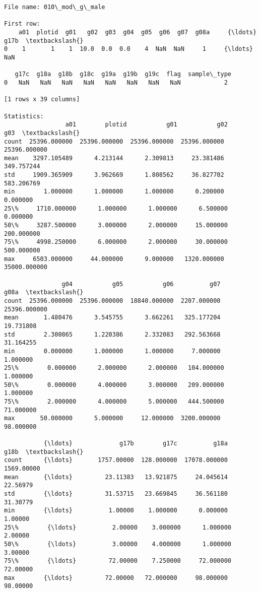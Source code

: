 \documentclass[11pt]{article}
\begin{document}
\begin{Verbatim}[commandchars=\\\{\}]
File name: 010\_mod\_g\_male

First row: 
    a01  plotid  g01   g02  g03  g04  g05  g06  g07  g08a     {\ldots}       g17b  \textbackslash{}
0    1       1    1  10.0  0.0  0.0    4  NaN  NaN     1     {\ldots}        NaN   

   g17c  g18a  g18b  g18c  g19a  g19b  g19c  flag  sample\_type  
0   NaN   NaN   NaN   NaN   NaN   NaN   NaN   NaN            2  

[1 rows x 39 columns]

Statistics: 
                 a01        plotid           g01           g02           g03  \textbackslash{}
count  25396.000000  25396.000000  25396.000000  25396.000000  25396.000000   
mean    3297.105489      4.213144      2.309813     23.381486    349.757244   
std     1909.365909      3.962669      1.808562     36.827702    583.206769   
min        1.000000      1.000000      1.000000      0.200000      0.000000   
25\%     1710.000000      1.000000      1.000000      6.500000      0.000000   
50\%     3287.500000      3.000000      2.000000     15.000000    200.000000   
75\%     4998.250000      6.000000      2.000000     30.000000    500.000000   
max     6503.000000     44.000000      9.000000   1320.000000  35000.000000   

                g04           g05           g06          g07          g08a  \textbackslash{}
count  25396.000000  25396.000000  18840.000000  2207.000000  25396.000000   
mean       1.480476      3.545755      3.662261   325.177204     19.731808   
std        2.300865      1.220386      2.332083   292.563668     31.164255   
min        0.000000      1.000000      1.000000     7.000000      1.000000   
25\%        0.000000      2.000000      2.000000   104.000000      1.000000   
50\%        0.000000      4.000000      3.000000   209.000000      1.000000   
75\%        2.000000      4.000000      5.000000   444.500000     71.000000   
max       50.000000      5.000000     12.000000  3200.000000     98.000000   

           {\ldots}             g17b        g17c          g18a        g18b  \textbackslash{}
count      {\ldots}       1757.00000  128.000000  17078.000000  1569.00000   
mean       {\ldots}         23.11383   13.921875     24.045614    22.56979   
std        {\ldots}         31.53715   23.669845     36.561180    31.30779   
min        {\ldots}          1.00000    1.000000      0.000000     1.00000   
25\%        {\ldots}          2.00000    3.000000      1.000000     2.00000   
50\%        {\ldots}          3.00000    4.000000      1.000000     3.00000   
75\%        {\ldots}         72.00000    7.250000     72.000000    72.00000   
max        {\ldots}         72.00000   72.000000     98.000000    98.00000   


\end{Verbatim}
\end{document}
